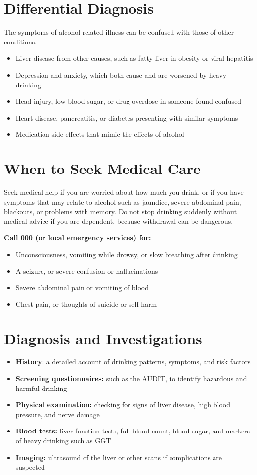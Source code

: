 \section*{Differential Diagnosis}
The symptoms of alcohol-related illness can be confused with those of other conditions.

\begin{itemize}
    \item Liver disease from other causes, such as fatty liver in obesity or viral hepatitis
    \item Depression and anxiety, which both cause and are worsened by heavy drinking
    \item Head injury, low blood sugar, or drug overdose in someone found confused
    \item Heart disease, pancreatitis, or diabetes presenting with similar symptoms
    \item Medication side effects that mimic the effects of alcohol
\end{itemize}

\section*{When to Seek Medical Care}
Seek medical help if you are worried about how much you drink, or if you have symptoms that may relate to alcohol such as jaundice, severe abdominal pain, blackouts, or problems with memory. Do not stop drinking suddenly without medical advice if you are dependent, because withdrawal can be dangerous.

\textbf{Call 000 (or local emergency services) for:}
\begin{itemize}
    \item Unconsciousness, vomiting while drowsy, or slow breathing after drinking
    \item A seizure, or severe confusion or hallucinations
    \item Severe abdominal pain or vomiting of blood
    \item Chest pain, or thoughts of suicide or self-harm
\end{itemize}

\section*{Diagnosis and Investigations}
\begin{itemize}
    \item \textbf{History:} a detailed account of drinking patterns, symptoms, and risk factors
    \item \textbf{Screening questionnaires:} such as the AUDIT, to identify hazardous and harmful drinking
    \item \textbf{Physical examination:} checking for signs of liver disease, high blood pressure, and nerve damage
    \item \textbf{Blood tests:} liver function tests, full blood count, blood sugar, and markers of heavy drinking such as GGT
    \item \textbf{Imaging:} ultrasound of the liver or other scans if complications are suspected
\end{itemize}


